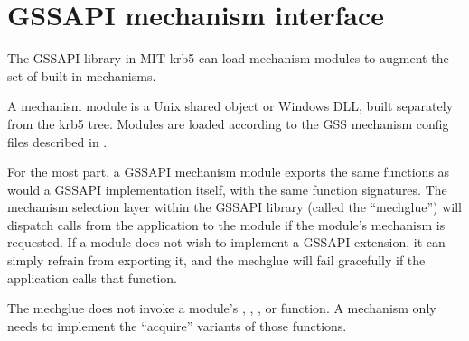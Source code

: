\documentclass[letterpaper,10pt,english]{sphinxmanual}
\begin{document}
\begin{sphinxVerbatim}[commandchars=\\\{\}]
     
                     

     
                     
      
      
      
     
\end{sphinxVerbatim}


\section{GSSAPI mechanism interface}
\label{\detokenize{plugindev/gssapi::doc}}\label{\detokenize{plugindev/gssapi:gssapi-mechanism-interface}}
The GSSAPI library in MIT krb5 can load mechanism modules to augment
the set of built-in mechanisms.

A mechanism module is a Unix shared object or Windows DLL, built
separately from the krb5 tree.  Modules are loaded according to the
GSS mechanism config files described in .

For the most part, a GSSAPI mechanism module exports the same
functions as would a GSSAPI implementation itself, with the same
function signatures.  The mechanism selection layer within the GSSAPI
library (called the “mechglue”) will dispatch calls from the
application to the module if the module’s mechanism is requested.  If
a module does not wish to implement a GSSAPI extension, it can simply
refrain from exporting it, and the mechglue will fail gracefully if
the application calls that function.

The mechglue does not invoke a module’s ,
, , or
 function.  A mechanism only needs to
implement the “acquire” variants of those functions.
\end{document}
